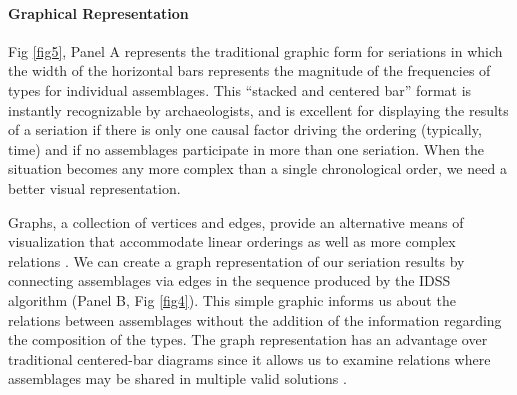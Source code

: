 \documentclass[10pt,letterpaper]{article}
\begin{document}
\paragraph{Graphical Representation}

Fig \ref{fig5}, Panel A represents the traditional graphic form for seriations in which the width of the horizontal bars represents the magnitude of the frequencies of types for individual assemblages. This ``stacked and centered bar'' format is instantly recognizable by archaeologists, and is excellent for displaying the results of a seriation if there is only one causal factor driving the ordering (typically, time) and if no assemblages participate in more than one seriation. When the situation becomes any more complex than a single chronological order, we need a better visual representation.

Graphs, a collection of vertices and edges, provide an alternative means of visualization that accommodate linear orderings as well as more complex relations \cite{Diestel2010,Flament1963,Harary1969,Lipo2005,Wasserman1994}. We can create a graph representation of our seriation results by connecting assemblages via edges in the sequence produced by the IDSS algorithm (Panel B, Fig \ref{fig4}). This simple graphic informs us about the relations between assemblages without the addition of the information regarding the composition of the types. The graph representation has an advantage over traditional centered-bar diagrams since it allows us to examine relations where assemblages may be shared in multiple valid solutions \cite{Cochrane2010,Lipo2005}.   
\end{document}
